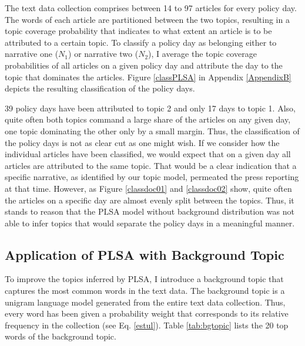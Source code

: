 \documentclass[11pt,a4paper,english,oneside]{book}
\numberwithin{equation}{chapter}
\begin{document}
The text data collection comprises between 14 to 97 articles for every policy day. The words of each article are partitioned between the two topics, resulting in a topic coverage probability that indicates to what extent an article is to be attributed to a certain topic. To classify a policy day as belonging either to narrative one ($N_1$) or narrative two ($N_2$), I average the topic coverage probabilities of all articles on a given policy day and attribute the day to the topic that dominates the articles. Figure \ref{classPLSA} in Appendix \ref{AppendixB} depicts the resulting classification of the policy days. 

39 policy days have been attributed to topic 2 and only 17 days to topic 1. Also, quite often both topics command a large share of the articles on any given day, one topic dominating the other only by a small margin. Thus, the classification of the policy days is not as clear cut as one might wish. If we consider how the individual articles have been classified, we would expect that on a given day all articles are attributed to the same topic. That would be a clear indication that a specific narrative, as identified by our topic model, permeated the press reporting at that time. However, as Figure \ref{classdoc01} and \ref{classdoc02} show, quite often the articles on a specific day are almost evenly split between the topics.  
Thus, it stands to reason that the PLSA model without background distribution was not able to infer topics that would separate the policy days in a meaningful manner.

\subsection{Application of PLSA with Background Topic}\label{Ch:implembg}

To improve the topics inferred by PLSA, I introduce a background topic that captures the most common words in the text data. The background topic is a unigram language model generated from the entire text data collection. Thus, every word has been given a probability weight that corresponds to its relative frequency in the collection (see Eq. \ref{estul}). Table \ref{tab:bgtopic} lists the 20 top words of the background topic. 
\end{document}
